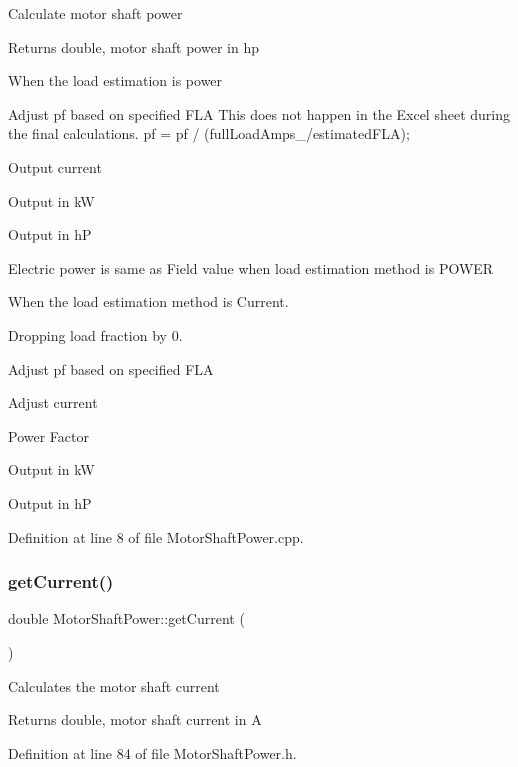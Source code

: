 Calculate motor shaft power \begin{DoxyReturn}{Returns}
double, motor shaft power in hp 
\end{DoxyReturn}
When the load estimation is power

Adjust pf based on specified F\+LA This does not happen in the Excel sheet during the final calculations. pf = pf / (full\+Load\+Amps\+\_\+/estimated\+F\+LA);

Output current

Output in kW

Output in hP

Electric power is same as Field value when load estimation method is P\+O\+W\+ER

When the load estimation method is Current.

Dropping load fraction by 0.

Adjust pf based on specified F\+LA

Adjust current

Power Factor

Output in kW

Output in hP 

Definition at line 8 of file Motor\+Shaft\+Power.\+cpp.

\mbox{\label{class_motor_shaft_power_a433c78f782a5c621cc529906a0b10545}} 
\subsubsection{\texorpdfstring{get\+Current()}{getCurrent()}}
{\footnotesize\ttfamily double Motor\+Shaft\+Power\+::get\+Current (\begin{DoxyParamCaption}{ }\end{DoxyParamCaption})\hspace{0.3cm}{\ttfamily [inline]}}

Calculates the motor shaft current \begin{DoxyReturn}{Returns}
double, motor shaft current in A 
\end{DoxyReturn}


Definition at line 84 of file Motor\+Shaft\+Power.\+h.

\mbox{\label{class_motor_shaft_power_acc28811af383f9baabb3972a9a214ac9}} 
